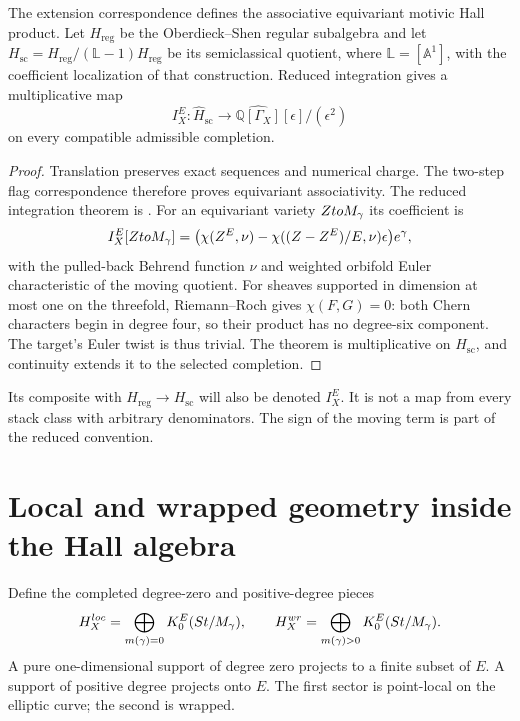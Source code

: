 \begin{theorem}
The extension correspondence defines the associative equivariant
motivic Hall product. Let $H_{\mathrm{reg}}$ be the Oberdieck--Shen
regular subalgebra and let
$H_{\mathrm{sc}}=H_{\mathrm{reg}}/(\mathbb L-1)H_{\mathrm{reg}}$ be
its semiclassical quotient, where $\mathbb L=[\mathbb A^1]$, with the coefficient localization of that construction.
Reduced integration gives a multiplicative map
\[
 I_X^E:\widehat H_{\mathrm{sc}}\longrightarrow
       \widehat{\mathbb Q[\Gamma_X]}[\epsilon]/(\epsilon^2)
\]
on every compatible admissible completion.
\end{theorem}
\begin{proof}
Translation preserves exact sequences and numerical charge. The
two-step flag correspondence therefore proves equivariant associativity.
The reduced integration theorem is \cite[Theorem~5]{OberdieckShen}.
For an equivariant variety $ZtoM_\gamma$ its coefficient is
\[
 I_X^E[ZtoM_\gamma]
 =\bigl(\chi(Z^E,\nu)-\chi((Z-Z^E)/E,\nu)\epsilon\bigr)e^\gamma,
\]
with the pulled-back Behrend function $\nu$ and weighted orbifold Euler
characteristic of the moving quotient. For sheaves supported in
dimension at most one on the threefold, Riemann--Roch gives
$\chi(F,G)=0$: both Chern characters begin in degree four, so their
product has no degree-six component. The target's Euler twist is thus
trivial. The theorem is multiplicative on $H_{\mathrm{sc}}$, and
continuity extends it to the selected completion.
\end{proof}

Its composite with $H_{\mathrm{reg}}\to H_{\mathrm{sc}}$ will also
be denoted $I_X^E$. It is not a map from every stack class with arbitrary
denominators. The sign of the moving term is part of the reduced convention.

\section{Local and wrapped geometry inside the Hall algebra}
Define the completed degree-zero and positive-degree pieces
\[
 H_X^{loc}
 =\bigoplus_{m(\gamma)=0}
 K_0^E(St/M_\gamma),
 \qquad
 H_X^{wr}
 =\bigoplus_{m(\gamma)>0}
 K_0^E(St/M_\gamma).
\]
A pure one-dimensional support of degree zero projects to a finite subset of $E$.  A support of positive degree projects onto $E$.  The first sector is point-local on the elliptic curve; the second is wrapped.

